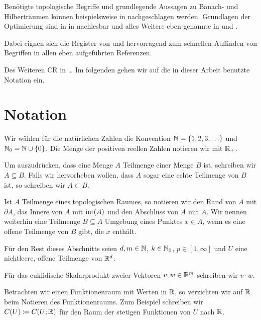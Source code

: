 Benötigte topologische Begriffe und grundlegende Aussagen zu Banach- und
Hilberträumen können beispielsweise in \cite{Zei86} nachgeschlagen werden.
Grundlagen der Optimierung sind in in \cite{Zei85} nachlesbar und alles Weitere
eben genannte in \cite{Zei90a} und \cite{Zei90b}. 

Dabei eignen sich die Register von \cite{Zei90b} und \cite{Zei85} hervorragend
zum schnellen Auffinden von Begriffen in allen eben aufgeführten
Referenzen.

Des Weiteren CR in \ldots
Im folgenden  gehen wir auf die in dieser Arbeit benutzte
Notation ein.


\section{Notation}
\label{sec:notation}

Wir wählen für die natürlichen Zahlen die Konvention
$\mathbb{N}=\{1,2,3,\ldots\}$ und $\mathbb{N}_0=\mathbb{N}\cup\{0\}$. 
Die Menge der positiven reellen Zahlen notieren wir mit $\mathbb{R}_+$.

Um auszudrücken, dass eine Menge $A$ Teilmenge einer Menge $B$ ist, schreiben
wir $A\subseteq B$. Falls wir hervorheben wollen, dass $A$ sogar eine echte
Teilmenge von $B$ ist, so schreiben wir $A\subset B$.

Ist $A$ Teilmenge eines topologischen Raumes, so notieren wir den Rand von $A$
mit $\partial A$, das Innere von $A$ mit $\operatorname{int}(A)$ und den Abschluss
von $A$ mit $\overline A$.
Wir nennen weiterhin eine Teilmenge $B\subseteq A$ Umgebung eines Punktes $x\in
A$, wenn es eine offene Teilmenge von $B$ gibt, die $x$ enthält.

Für den Rest dieses Abschnitts seien $d,m\in\mathbb{N}$, $k\in\mathbb{N}_0$,
$p\in[1,\infty]$ und $U$ eine nichtleere, offene Teilmenge von $\mathbb{R}^d$.

Für das euklidische Skalarprodukt zweier Vektoren $v,w\in \mathbb{R}^m$ schreiben wir
$v\cdot w$.

Betrachten wir einen Funktionenraum mit Werten in $\mathbb{R}$, so verzichten wir auf
$\mathbb{R}$ beim Notieren des Funktionenraums. Zum Beispiel schreiben wir 
$C(U)\coloneqq C(U;\mathbb{R})$ für den Raum der stetigen Funktionen von $U$ nach
$\mathbb{R}$.


